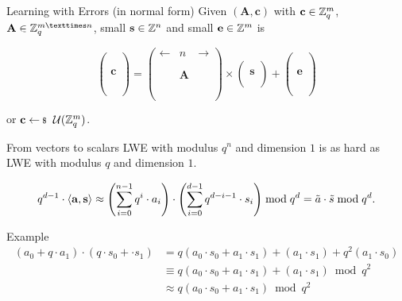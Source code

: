 \documentclass[presentation,smaller]{beamer}
\renewcommand{\vec}[1]{\ensuremath{\mathbf{#1}}\xspace}
\begin{document}
\begin{frame}[label={sec:org3f1dbc5}]{Learning with Errors (in normal form)}
Given \((\vec{A},\vec{c})\) with \(\vec{c} \in \ZZ_q^{m}\), \(\vec{A} \in \ZZ_q^{m × n}\), small \(\vec{s} \in \ZZ^{n}\) and small \(\vec{e} \in \ZZ^{m}\) is

\[
\left(\begin{array}{c}
\\
\\
\\ 
\vec{c} \\
\\
\\
\\
\end{array} \right) = \left(
\begin{array}{ccc}
\leftarrow & n & \rightarrow \\
\\
\\ 
& \vec{A} & \\
\\
\\
\\
\end{array} \right) \times \left( \begin{array}{c}
\\
\vec{s} \\
\\
\end{array} \right) + \left(
\begin{array}{c}
\\
\\
\\ 
\vec{e} \\
\\
\\
\\
\end{array} 
\right)
\]

or \(\vec{c} \sample \mathcal{U}(\ZZ_q^{m})\).
\end{frame}

\begin{frame}[label={sec:org11219d7}]{From vectors to scalars}
LWE with modulus \(q^n\) and dimension \(1\) is as hard as LWE with modulus \(q\) and dimension \(1\).

\[q^{d-1} \cdot \Angle{\vec{a},\vec{s}} \approx \left(\sum_{i=0}^{n-1} q^{i} \cdot a_{i}\right) \cdot \left(\sum_{i=0}^{d-1} q^{d-i-1} \cdot s_{i}\right) \bmod q^{d} = \tilde{a} \cdot \tilde{s} \bmod q^{d}.\] 

\begin{block}{Example}
\begin{align*}
\left(a_0 + q\cdot a_1\right) \cdot \left(q \cdot s_0 + \cdot s_1\right) &= q(a_0\cdot s_0 + a_1 \cdot s_1) + (a_1 \cdot s_1) + q^2 (a_1 \cdot s_0)\\
&\equiv q(a_0\cdot s_0 + a_1 \cdot s_1) + (a_1 \cdot s_1) \bmod q^2\\
&\approx q(a_0\cdot s_0 + a_1 \cdot s_1) \bmod q^2
\end{align*}
\end{block}
\end{frame}
\end{document}

